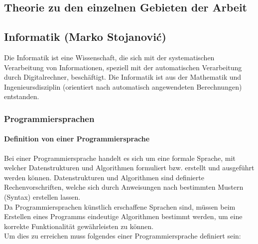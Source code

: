 \documentclass[12pt,a4paper]{report}
\begin{document}
\begin{onehalfspace}
\part{Theorie zu den einzelnen Gebieten der Arbeit}

\chapter{Informatik (Marko Stojanovi\'{c})}
Die Informatik ist eine Wissenschaft, die sich mit der systematischen Verarbeitung von Informationen, speziell mit der automatischen Verarbeitung durch Digitalrechner, beschäftigt. Die Informatik ist aus der Mathematik und Ingenieursdisziplin (orientiert nach automatisch angewendeten Berechnungen) entstanden.

\section{Programmiersprachen}

\subsection{Definition von einer Programmiersprache}
Bei einer Programmiersprache handelt es sich um eine formale Sprache, mit welcher Datenstrukturen und Algorithmen formuliert bzw. erstellt und ausgeführt werden können. Datenstrukturen und Algorithmen sind definierte Rechenvorschriften, welche sich durch Anweisungen nach bestimmten Mustern (Syntax) erstellen lassen.\\

Da Programmiersprachen künstlich erschaffene Sprachen sind, müssen beim Erstellen eines Programms eindeutige Algorithmen bestimmt werden, um eine korrekte Funktionalität gewährleisten zu können.\\
Um dies zu erreichen muss folgendes einer Programmiersprache definiert sein:


\end{onehalfspace}
\end{document}
